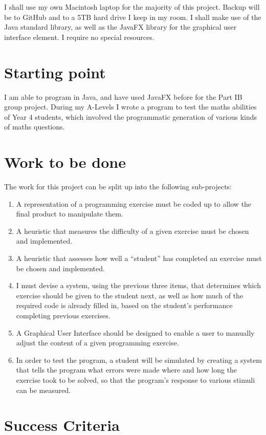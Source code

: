 \documentclass[12pt,a4paper,twoside]{article}
\begin{document}
I shall use my own Macintosh laptop for the majority of this project. Backup will be to GitHub and to a 5TB hard drive I keep in my room. I shall make use of the Java standard library, as well as the JavaFX library for the graphical user interface element. I require no special resources.

\section*{Starting point}

I am able to program in Java, and have used JavaFX before for the Part IB group project. During my A-Levels I wrote a program to test the maths abilities of Year 4 students, which involved the programmatic generation of various kinds of maths questions.

\section*{Work to be done}

The work for this project can be split up into the following sub-projects:
\begin{enumerate}
\item{A representation of a programming exercise must be coded up to allow the final product to manipulate them.}
\item{A heuristic that measures the difficulty of a given exercise must be chosen and implemented.}
\item{A heuristic that assesses how well a ``student'' has completed an exercise must be chosen and implemented.}
\item{I must devise a system, using the previous three items, that determines which exercise should be given to the student next, as well as how much of the required code is already filled in, based on the student's performance completing previous exercises.}
\item{A Graphical User Interface should be designed to enable a user to manually adjust the content of a given programming exercise.}
\item{In order to test the program, a student will be simulated by creating a system that tells the program what errors were made where and how long the exercise took to be solved, so that the program's response to various stimuli can be measured.}
\end{enumerate}

\section*{Success Criteria}
\end{document}
